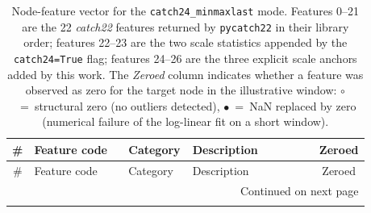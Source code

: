 {\small\sloppy
\setlength{\tabcolsep}{4pt}%
\renewcommand{\arraystretch}{1.05}%
\begin{longtable}{@{}c
  >{\ttfamily\raggedright\arraybackslash}p{0.30\linewidth}
  >{\raggedright\arraybackslash}p{0.18\linewidth}
  >{\raggedright\arraybackslash}p{0.40\linewidth}
  c@{}}
\caption{Node-feature vector for the \texttt{catch24\_minmaxlast} mode.
         Features 0--21 are the 22 \textit{catch22} features returned by
         \texttt{pycatch22} in their library order; features 22--23 are the
         two scale statistics appended by the \texttt{catch24=True} flag;
         features 24--26 are the three explicit scale anchors added by this
         work.  The \textit{Zeroed} column indicates whether a feature was
         observed as zero for the target node in the illustrative window:
         $\circ$~=~structural zero (no outliers detected),
         $\bullet$~=~NaN replaced by zero (numerical failure of the
         log-linear fit on a short window).}
\label{tab:node_features} \\
\toprule
\# & Feature code & Category & Description & Zeroed \\
\midrule
\endfirsthead
\toprule
\# & Feature code & Category & Description & Zeroed \\
\midrule
\endhead
\midrule
\multicolumn{5}{r}{\footnotesize Continued on next page} \\
\endfoot
\bottomrule
\endlastfoot


\end{longtable}}
